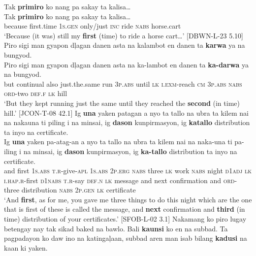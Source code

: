 \ea
\label{bkm:Ref479573710}
Tak  \textbf{primiro}  ko  nang  pa  sakay  ta  kalisa… \\\smallskip
 \gll Tak  \textbf{primiro}  ko  nang  pa  sakay  ta  kalisa… \\
because  first.time  1\textsc{s.gen}  only/just  \textsc{inc}  ride  \textsc{nabs}  horse.cart \\
\glt ‘Because (it was) still my \textbf{first} (time) to ride a horse cart…' [DBWN-L-23 5.10]
\z
\ea
\label{bkm:Ref479574075}
Piro  sigi  man  gyapon  dļagan  danen  asta  na  kalambot en  danen  ta  \textbf{karwa}  ya  na  bungyod. \\\smallskip
 \gll Piro  sigi  man  gyapon  dļagan  danen  asta  na  ka-lambot en  danen  ta  \textbf{ka-darwa}  ya  na  bungyod. \\
but  continual  also   just.the.same  run  3\textsc{p.abs}  until  \textsc{lk}  \textsc{i.exm}-reach \textsc{cm}  3\textsc{p.abs}  \textsc{nabs}  \textsc{ord}-two  \textsc{def.f}  \textsc{lk}  hill \\
\glt `But they kept running just the same until they reached the \textbf{second} (in time) hill.’ [JCON-T-08 42.1]
\z
\ea
\label{bkm:Ref479574197}
Ig  \textbf{una}  yaken  patagan  a  nyo  ta  tallo  na  ubra  ta kilem  nai  na  nakauna  ti  piling  i  na  minsai,  ig \textbf{dason} kunpirmasyon,  ig  \textbf{katallo}  distribution  ta  inyo  na  certificate. \\\smallskip
 \gll Ig  \textbf{una}  yaken  pa-atag-an  a  nyo  ta  tallo  na  ubra  ta kilem  nai  na  naka-una  ti  pa-iling  i  na  minsai,  ig \textbf{dason} kunpirmasyon,  ig  \textbf{ka-tallo}  distribution  ta  inyo  na  certificate. \\
and  first  1\textsc{s.abs}  \textsc{t.r}-give-\textsc{apl}  1\textsc{s.abs}  2\textsc{p.erg}  \textsc{nabs}  three  \textsc{lk}  work  \textsc{nabs}
night  \textsc{d}1\textsc{adj}  \textsc{lk}  \textsc{i.hap.r}-first  \textsc{d}1\textsc{nabs}  \textsc{t.r}-say  \textsc{def.n}  \textsc{lk} message  and  next confirmation  and  \textsc{ord}-three  distribution  \textsc{nabs}  2\textsc{p.gen}  \textsc{lk}  certificate \\
\glt`And \textbf{first}, as for me, you gave me three things to do this night which are the one that is first of these is called the message, and \textbf{next} confirmation and \textbf{third} (in time) distribution of your certificates.’ [SFOB-L-02 3.1]
\z
\ea
\label{bkm:Ref481151157}
Nakamang  ko  piro  lugay  betengay  nay  tak  sikad  baked na  bawlo.  Bali  \textbf{kaunsi}  ko  en  na  subbad.  Ta pagpadayon  ko  daw  ino  na  katingaļaan,  subbad aren  man  isab  bilang  \textbf{kadusi}  na  kaan  ki  yaken. \\\smallskip
